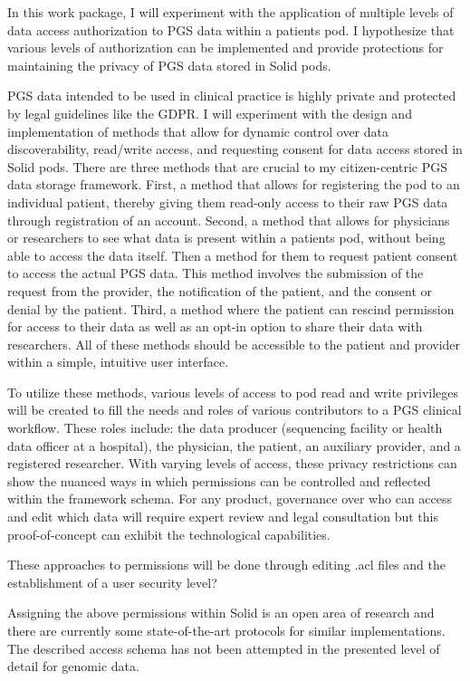 \documentclass[runningheads]{llncs}
\begin{document}
In this work package, I will experiment with the application of multiple levels of data access authorization to PGS data within a patient\textquotesingle s pod. I hypothesize that various levels of authorization can be implemented and provide protections for maintaining the privacy of PGS data stored in Solid pods.

PGS data intended to be used in clinical practice is highly private and protected by legal guidelines like the GDPR. 
I will experiment with the design and implementation of methods that allow for dynamic control over data discoverability, read/write access, and requesting consent for data access stored in Solid pods.
There are three methods that are crucial to my citizen-centric PGS data storage framework.
First, a method that allows for registering the pod to an individual patient, thereby giving them read-only access to their raw PGS data through registration of an account.
Second, a method that allows for physicians or researchers to see what data is present within a patient\textquotesingle s pod, without being able to access the data itself. 
Then a method for them to request patient consent to access the actual PGS data. 
This method involves the submission of the request from the provider, the notification of the patient, and the consent or denial by the patient.
Third, a method where the patient can rescind permission for access to their data as well as an opt-in option to share their data with researchers. 
All of these methods should be accessible to the patient and provider within a simple, intuitive user interface.

To utilize these methods, various levels of access to pod read and write privileges will be created to fill the needs and roles of various contributors to a PGS clinical workflow. 
These roles include: the data producer (sequencing facility or health data officer at a hospital), the physician, the patient, an auxiliary provider, and a registered researcher.
With varying levels of access, these privacy restrictions can show the nuanced ways in which permissions can be controlled and reflected within the framework schema.
For any product, governance over who can access and edit which data will require expert review and legal consultation but this proof-of-concept can exhibit the technological capabilities. 

These approaches to permissions will be done through editing .acl files and the establishment of a user security level?

Assigning the above permissions within Solid is an open area of research and there are currently some state-of-the-art protocols for similar implementations. The described access schema has not been attempted in the presented level of detail for genomic data.
\end{document}
